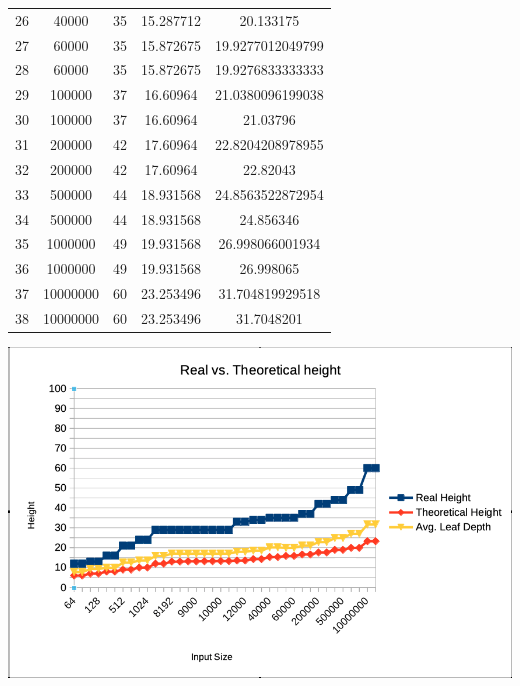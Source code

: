 \documentclass[12pt, a4paper]{article}
\begin{document}
\begin{table}[H]
\begin{tabular}{|c|c|c|c|c|}
      26 & 40000 & 35 & 15.287712 & 20.133175 \\
      27 & 60000 & 35 & 15.872675 & 19.9277012049799 \\
      28 & 60000 & 35 & 15.872675 & 19.9276833333333 \\
      29 & 100000 & 37 & 16.60964 & 21.0380096199038 \\
      30 & 100000 & 37 & 16.60964 & 21.03796 \\
      31 & 200000 & 42 & 17.60964 & 22.8204208978955 \\
      32 & 200000 & 42 & 17.60964 & 22.82043 \\
      33 & 500000 & 44 & 18.931568 & 24.8563522872954 \\
      34 & 500000 & 44 & 18.931568 & 24.856346 \\
      35 & 1000000 & 49 & 19.931568 & 26.998066001934 \\
      36 & 1000000 & 49 & 19.931568 & 26.998065 \\
      37 & 10000000 & 60 & 23.253496 & 31.704819929518 \\
      38 & 10000000 & 60 & 23.253496 & 31.7048201 \\
      \hline
    \end{tabular}
    \label{table:experiments_results}
  \end{table}



  \begin{minipage}[t]{\linewidth}
    \includegraphics[width=\textwidth]{results}
    \label{fig:graph_result}
  \end{minipage}
\end{document}
